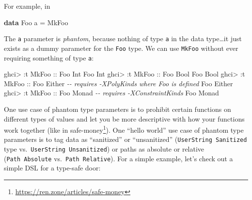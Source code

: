 \documentclass[]{article}
\newenvironment{Shaded}{}{}
\newcommand{\CommentTok}[1]{\textcolor[rgb]{0.38,0.63,0.69}{\textit{#1}}}
\newcommand{\DataTypeTok}[1]{\textcolor[rgb]{0.56,0.13,0.00}{#1}}
\newcommand{\KeywordTok}[1]{\textcolor[rgb]{0.00,0.44,0.13}{\textbf{#1}}}
\newcommand{\NormalTok}[1]{#1}
\newcommand{\OperatorTok}[1]{\textcolor[rgb]{0.40,0.40,0.40}{#1}}
\newcommand{\OtherTok}[1]{\textcolor[rgb]{0.00,0.44,0.13}{#1}}
\renewcommand{\href}[2]{#2\footnote{\url{#1}}}
\begin{document}
For example, in

\begin{Shaded}
\begin{Highlighting}[]
\KeywordTok{data} \DataTypeTok{Foo}\NormalTok{ a }\OtherTok{=} \DataTypeTok{MkFoo}
\end{Highlighting}
\end{Shaded}

The \texttt{a} parameter is \emph{phantom}, because nothing of type \texttt{a}
in the data type\ldots it just exists as a dummy parameter for the \texttt{Foo}
type. We can use \texttt{MkFoo} without ever requiring something of type
\texttt{a}:

\begin{Shaded}
\begin{Highlighting}[]
\NormalTok{ghci}\OperatorTok{>} \OperatorTok{:}\NormalTok{t }\DataTypeTok{MkFoo}\OtherTok{ ::} \DataTypeTok{Foo} \DataTypeTok{Int}
\DataTypeTok{Foo} \DataTypeTok{Int}
\NormalTok{ghci}\OperatorTok{>} \OperatorTok{:}\NormalTok{t }\DataTypeTok{MkFoo}\OtherTok{ ::} \DataTypeTok{Foo} \DataTypeTok{Bool}
\DataTypeTok{Foo} \DataTypeTok{Bool}
\NormalTok{ghci}\OperatorTok{>} \OperatorTok{:}\NormalTok{t }\DataTypeTok{MkFoo}\OtherTok{ ::} \DataTypeTok{Foo} \DataTypeTok{Either}      \CommentTok{{-}{-} requires {-}XPolyKinds where \textquotesingle{}Foo\textquotesingle{} is defined}
\DataTypeTok{Foo} \DataTypeTok{Either}
\NormalTok{ghci}\OperatorTok{>} \OperatorTok{:}\NormalTok{t }\DataTypeTok{MkFoo}\OtherTok{ ::} \DataTypeTok{Foo} \DataTypeTok{Monad}       \CommentTok{{-}{-} requires {-}XConstraintKinds}
\DataTypeTok{Foo} \DataTypeTok{Monad}
\end{Highlighting}
\end{Shaded}

One use case of phantom type parameters is to prohibit certain functions on
different types of values and let you be more descriptive with how your
functions work together (like in
\href{https://ren.zone/articles/safe-money}{safe-money}). One ``hello world''
use case of phantom type parameters is to tag data as ``sanitized'' or
``unsanitized'' (\texttt{UserString\ \textquotesingle{}Sanitized} type
vs.~\texttt{UserString\ \textquotesingle{}Unsanitized}) or paths as absolute or
relative (\texttt{Path\ \textquotesingle{}Absolute}
vs.~\texttt{Path\ \textquotesingle{}Relative}). For a simple example, let's
check out a simple DSL for a type-safe door:
\end{document}
